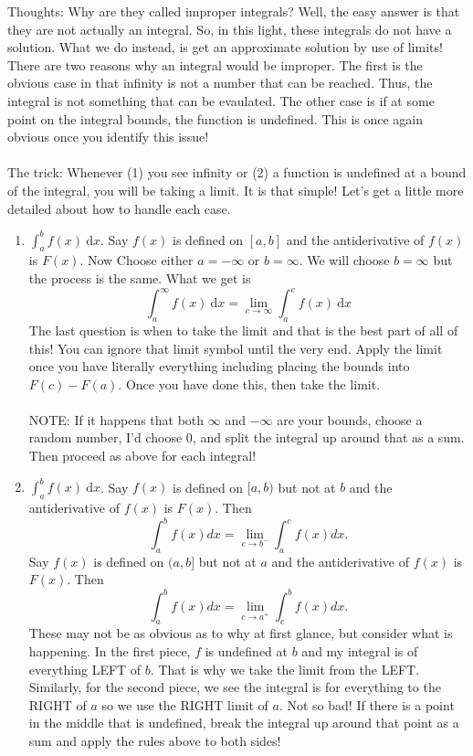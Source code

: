 \documentclass[10pt]{article}
\newcommand{\dx}{\:\mathrm{d}x}
\theoremstyle{Theorem}
\theoremstyle{definition}
\theoremstyle{remark}
\theoremstyle{custom}
\begin{document}
\thispagestyle{firststyle}
\pagestyle{plain}


\noindent Thoughts: Why are they called improper integrals? Well, the easy answer is that they are not actually an integral. So, in this light, these integrals do not have a solution. What we do instead, is get an approximate solution by use of limits! There are two reasons why an integral would be improper. The first is the obvious case in that infinity is not a number that can be reached. Thus, the integral is not something that can be evaulated. The other case is if at some point on the integral bounds, the function is undefined. This is once again obvious once you identify this issue!\\\\
The trick: Whenever (1) you see infinity or (2) a function is undefined at a bound of the integral, you will be taking a limit. It is that simple! Let's get a little more detailed about how to handle each case.
\begin{enumerate}[1.]
\item $\int_a^b f(x) \dx$. Say $f(x)$ is defined on $[a,b]$ and the antiderivative of $f(x)$ is $F(x)$. Now Choose either $a=-\infty$ or $b=\infty$. We will choose $b=\infty$ but the process is the same. What we get is
\[
\int_a^{\infty} f(x) \dx=\lim_{c\rightarrow \infty}\int_a^c f(x) \dx
\]
The last question is when to take the limit and that is the best part of all of this! You can ignore that limit symbol until the very end. Apply the limit once you have literally everything including placing the bounds into $F(c)-F(a)$. Once you have done this, then take the limit.\\\\
NOTE:  If it happens that both $\infty$ and $-\infty$ are your bounds, choose a random number, I'd choose 0, and split the integral up around that as a sum. Then proceed as above for each integral!
\item $\int_a^b f(x) \dx$. Say $f(x)$ is defined on $[a,b)$ but not at $b$ and the antiderivative of $f(x)$ is $F(x)$. Then
\[
\int^b_af(x)dx=\lim_{c\rightarrow b^-}\int^c_a f(x)dx.
\]
Say $f(x)$ is defined on $(a,b]$ but not at $a$ and the antiderivative of $f(x)$ is $F(x)$. Then
\[
\int^b_af(x)dx=\lim_{c\rightarrow a^+}\int^b_c f(x)dx.
\]
These may not be as obvious as to why at first glance, but consider what is happening. In the first piece, $f$ is undefined at $b$ and my integral is of everything LEFT of $b$. That is why we take the limit from the LEFT. Similarly, for the second piece, we see the integral is for everything to the RIGHT of $a$ so we use the RIGHT limit of $a$. Not so bad! If there is a point in the middle that is undefined, break the integral up around that point as a sum and apply the rules above to both sides!
\end{enumerate}
\end{document}
